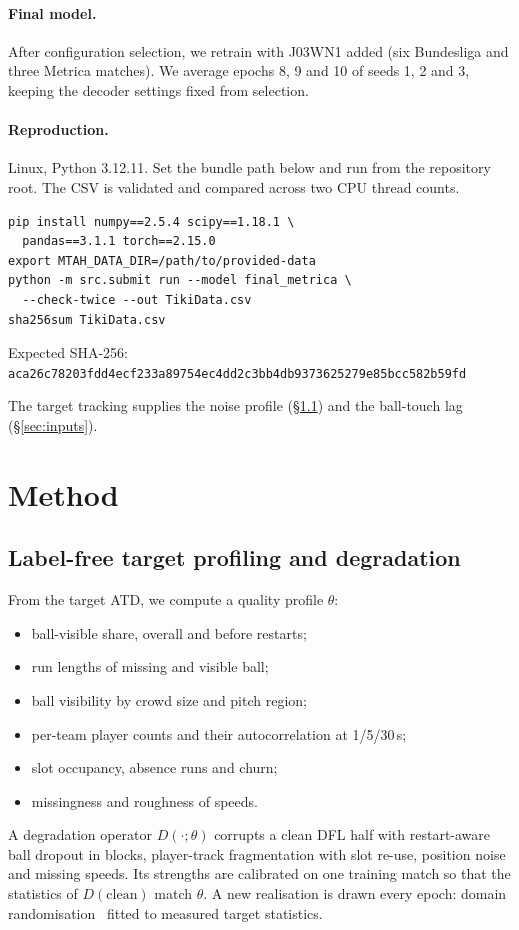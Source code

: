 \documentclass[10pt,a4paper,twocolumn]{article}
\begin{document}
\paragraph{Final model.} After configuration selection, we retrain with J03WN1 added
(six Bundesliga and three Metrica matches). We average epochs 8, 9 and 10 of seeds 1, 2 and 3,
keeping the decoder settings fixed from selection.

\paragraph{Reproduction.} Linux, Python 3.12.11. Set the bundle path below and run from the
repository root. The CSV is validated and compared across two CPU thread counts.
\begin{lstlisting}[aboveskip=3pt,belowskip=3pt]
pip install numpy==2.5.4 scipy==1.18.1 \
  pandas==3.1.1 torch==2.15.0
export MTAH_DATA_DIR=/path/to/provided-data
python -m src.submit run --model final_metrica \
  --check-twice --out TikiData.csv
sha256sum TikiData.csv
\end{lstlisting}
Expected SHA-256:\\
{\scriptsize\texttt{aca26c78203fdd4ecf233a89754ec4dd2c3bb4db9373625279e85bcc582b59fd}}

The target tracking supplies the noise profile (\S\ref{sec:degrade}) and the ball-touch lag
(\S\ref{sec:inputs}).

\section{Method}

\subsection{Label-free target profiling and degradation}\label{sec:degrade}

From the target ATD, we compute a quality profile $\theta$:
\begin{itemize}
  \item ball-visible share, overall and before restarts;
  \item run lengths of missing and visible ball;
  \item ball visibility by crowd size and pitch region;
  \item per-team player counts and their autocorrelation at 1/5/30\,s;
  \item slot occupancy, absence runs and churn;
  \item missingness and roughness of speeds.
\end{itemize}
A degradation operator $D(\cdot;\theta)$ corrupts a clean DFL half with restart-aware ball dropout
in blocks, player-track fragmentation with slot re-use, position noise and missing speeds. Its
strengths are calibrated on one training match so that the statistics of $D(\text{clean})$ match
$\theta$. A new realisation is drawn every epoch: domain randomisation~\cite{tobin2017} fitted
to measured target statistics.
\end{document}
